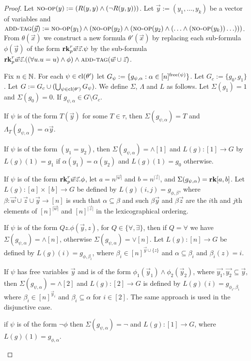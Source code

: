 \documentclass[../paper.tex]{subfiles}
\begin{document}
\begin{proof}
  Let ${\normalfont\textsc{no-op}}(y) := (R(y, y) \land (\neg R(y, y)))$. Let $\vec{y} := (y_1,
  \ldots, y_k)$ be a vector of variables and ${\normalfont\textsc{add-tag}} (\vec{y}) :=
  {\normalfont\textsc{no-op}}(y_1) \land ({\normalfont\textsc{no-op}}(y_2) \land ( {\normalfont\textsc{no-op}}(y_2) \land ( \ldots
  \land ({\normalfont\textsc{no-op}}(y_k)) \ldots)))$. From $\theta (\vec{x})$ we construct a new
  formula $\theta' (\vec{x})$ by replacing each sub-formula $\phi(\vec{y})$ of
  the form $\text{\textbf{rk}}^r_p \vec{w} \vec{z} . \psi$ by the sub-formula $\text{\textbf{rk}}^r_p
  \vec{w}\vec{z} . ((\forall u . u = u) \land \phi) \land {\normalfont\textsc{add-tag}}(\vec{w}
  \cup \vec{z})$.

  Fix $n \in \mathbb{N}$. For each $\psi \in \mathrm{cl}(\theta')$ let $G_\psi := \{g_{\psi,
    \alpha} : \alpha \in [n]^{\mathrm{free}(\psi)} \}$. Let $G_c := \{g_0, g_1\}$. Let
  $G := G_c \cup (\bigcup_{\psi \in \mathrm{cl}(\theta')} G_{\psi})$. We define
  $\Sigma$, $\Lambda$ and $L$ as follows. Let $\Sigma (g_1) = 1$ and $\Sigma
  (g_0) = 0$. If $g_{\psi, \alpha} \in G \setminus G_c$.

  \begin{itemizens}
  \item If $\psi$ is of the form $T(\vec{y})$ for some $T \in \tau$, then
    $\Sigma (g_{\psi, \alpha}) = T$ and $\Lambda_T (g_{\psi, \alpha}) = \alpha
    \vec{y}$.
  \item If $\psi$ is of the form $(y_1 = y_2)$, then $\Sigma (g_{\psi, \alpha})
    = \land[1]$ and $L(g) : [1] \rightarrow G$ by $L(g)(1) = g_1$ if $\alpha
    (y_1) = \alpha (y_2)$ and $L(g)(1) = g_0$ otherwise.
  \item If $\psi$ is of the form $\text{\textbf{rk}}^r_p \vec{w} \vec{z}. \phi$, let $a =
    n^{\vert \vec{w}\vert}$ and $b = n^{\vert \vec{z}\vert}$, and $\Sigma
    (g_{\psi, \alpha}) = \text{\textbf{rk}}[a, b]$. Let $L(g) : [a] \times [b] \rightarrow G$
    be defined by $L(g)(i,j) = g_{\phi, \beta}$, where $\beta : \vec{w} \cup
    \vec{z} \cup \vec{y} \rightarrow [n]$ is such that $\alpha \subseteq \beta$
    and such $\beta \vec{y}$ and $\beta \vec{z}$ are the $i$th and $j$th
    elements of $[n]^{\vert \vec{w} \vert}$ and $[n]^{\vert \vec{z} \vert}$ in
    the lexicographical ordering.
  \item If $\psi$ is of the form $Q z . \phi(\vec{y}, z)$, for $Q \in \{\forall,
    \exists\}$, then if $Q = \forall$ we have $\Sigma (g_{\psi, \alpha}) = \land
    [n]$, otherwise $\Sigma (g_{\psi, \alpha}) = \lor [n]$. Let $L(g) : [n]
    \rightarrow G$ be defined by $L(g)(i) = g_{\phi, \beta_i}$, where $\beta_i
    \in [n]^{\vec{y} \cup \{z\}}$ and $\alpha \subseteq \beta_i$ and $\beta_i
    (z) = i$.
  \item If $\psi$ has free variables $\vec{y}$ and is of the form $\phi_1
    (\vec{y}_1) \land \phi_2(\vec{y}_2)$, where $\vec{y_1}, \vec{y_2} \subseteq
    \vec{y}$, then $\Sigma(g_{\psi, \alpha}) = \land[2]$ and $L(g) : [2]
    \rightarrow G$ is defined by $L(g)(i) = g_{\phi_i, \beta_i}$ where $\beta_i
    \in [n]^{\vec{y}_i}$ and $\beta_i \subseteq \alpha$ for $i \in [2]$. The
    same approach is used in the disjunctive case.
  \item if $\psi$ is of the form $\neg \phi$ then $\Sigma (g_{\psi, \alpha}) =
    \neg$ and $L(g): [1] \rightarrow G$, where $L(g)(1) = g_{\phi, \alpha}$.
  \end{itemizens}


\end{proof}
\end{document}
